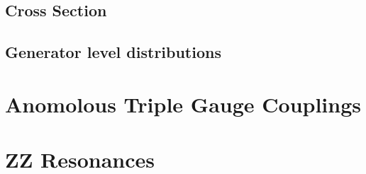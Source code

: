                                     \subsection{Cross Section}
                                    \subsection{Generator level distributions}
                                    \section{Anomolous Triple Gauge Couplings}
                                    \section{ZZ Resonances}
